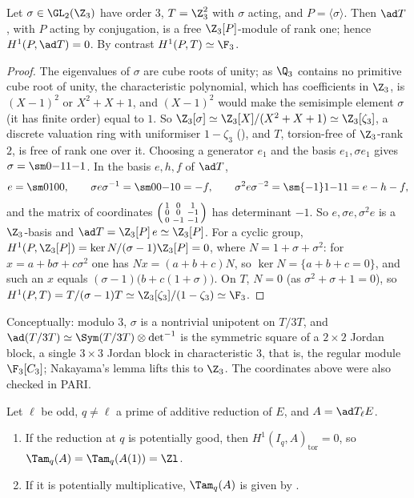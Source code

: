 \begin{proposition}\label{prop:blochkato:ad-free-c3}
Let $\sigma\in\GL_2(\Z_3)$ have order $3$, $T=\Z_3^2$ with $\sigma$ acting, and $P=\langle\sigma\rangle$. Then $\ad T$, with $P$ acting by conjugation, is a free $\Z_3[P]$-module of rank one; hence
$H^1(P,\ad T)=0$. By contrast $H^1(P,T)\simeq\F_3$.
\end{proposition}

\begin{proof}
The eigenvalues of $\sigma$ are cube roots of unity; as $\Q_3$ contains no primitive cube root of unity, the characteristic polynomial, which has coefficients in $\Z_3$, is
$(X-1)^2$ or $X^2+X+1$, and $(X-1)^2$ would make the semisimple element $\sigma$ (it has finite order) equal to $1$. So $\Z_3[\sigma]\simeq\Z_3[X]/(X^2+X+1)\simeq\Z_3[\zeta_3]$, a
discrete valuation ring with uniformiser $1-\zeta_3$ (), and $T$, torsion-free of $\Z_3$-rank $2$, is free of rank one over it. Choosing a generator $e_1$ and the
basis $e_1,\sigma e_1$ gives $\sigma=\sm0{-1}1{-1}$. In the basis $e,h,f$ of $\ad T$,
\[
e=\sm0100,\qquad\sigma e\sigma^{-1}=\sm00{-1}0=-f,\qquad\sigma^2e\sigma^{-2}=\sm{-1}1{-1}1=e-h-f,
\]
and the matrix of coordinates $\begin{psmallmatrix}1&0&1\\0&0&-1\\0&-1&-1\end{psmallmatrix}$ has determinant $-1$. So $e,\sigma e,\sigma^2e$ is a $\Z_3$-basis and $\ad T=\Z_3[P]\,e\simeq\Z_3[P]$. For a cyclic
group, $H^1(P,\Z_3[P])=\ker N/(\sigma-1)\Z_3[P]=0$, where $N=1+\sigma+\sigma^2$: for $x=a+b\sigma+c\sigma^2$ one has $Nx=(a+b+c)N$, so $\ker N=\{a+b+c=0\}$, and such an $x$
equals $(\sigma-1)\bigl(b+c(1+\sigma)\bigr)$. On $T$, $N=0$ (as $\sigma^2+\sigma+1=0$), so $H^1(P,T)=T/(\sigma-1)T\simeq\Z_3[\zeta_3]/(1-\zeta_3)\simeq\F_3$.
\end{proof}

\begin{sloppypar}Conceptually: modulo $3$, $\sigma$ is a nontrivial unipotent on $T/3T$, and $\ad(T/3T)\simeq\Sym(T/3T)\otimes\det^{-1}$ is the symmetric square of a $2\times2$ Jordan block, a single
$3\times3$ Jordan block in characteristic $3$, that is, the regular module $\F_3[C_3]$; Nakayama's lemma lifts this to $\Z_3$. The coordinates above were also checked in PARI.\end{sloppypar}

\begin{theorem}\label{thm:blochkato:tam-additive}
Let $\ell$ be odd, $q\ne\ell$ a prime of additive reduction of $E$, and $A=\ad T_\ell E$.
\begin{enumerate}[label=(\roman*)]
\item If the reduction at $q$ is potentially good, then $H^1(I_q,A)_{\mathrm{tor}}=0$, so $\Tam_q(A)=\Tam_q(A(1))=\Zl$.
\item If it is potentially multiplicative, $\Tam_q(A)$ is given by .
\end{enumerate}
\end{theorem}


